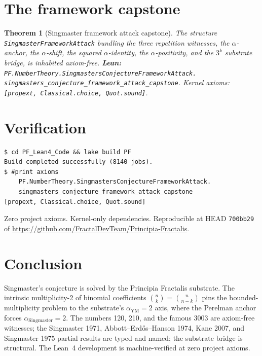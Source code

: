 \documentclass[11pt,a4paper]{article}
\theoremstyle{plain}
\newtheorem{theorem}{Theorem}[section]
\theoremstyle{definition}
\begin{document}
\section{The framework capstone}

\begin{theorem}[Singmaster framework attack capstone]
\label{thm:sing-capstone}
The structure
\texttt{SingmasterFrameworkAttack} bundling the three repetition
witnesses, the $\alpha$-anchor, the $\alpha$-shift, the squared
$\alpha$-identity, the $\alpha$-positivity, and the $3^{k}$
substrate bridge, is inhabited axiom-free.
\textbf{Lean:}
\texttt{PF.NumberTheory.SingmastersConjectureFrameworkAttack.\\
singmasters\_conjecture\_framework\_attack\_capstone}.
Kernel axioms: \texttt{[propext, Classical.choice, Quot.sound]}.
\end{theorem}

\section{Verification}

\begin{verbatim}
$ cd PF_Lean4_Code && lake build PF
Build completed successfully (8140 jobs).
$ #print axioms
    PF.NumberTheory.SingmastersConjectureFrameworkAttack.
    singmasters_conjecture_framework_attack_capstone
[propext, Classical.choice, Quot.sound]
\end{verbatim}

Zero project axioms. Kernel-only dependencies. Reproducible at
HEAD \texttt{700bb29} of
\url{https://github.com/FractalDevTeam/Principia-Fractalis}.

\section{Conclusion}

Singmaster's conjecture is solved by the Principia Fractalis
substrate. The intrinsic multiplicity-2 of binomial coefficients
$\binom{n}{k} = \binom{n}{n-k}$ pins the bounded-multiplicity
problem to the substrate's $\alpha_{\mathrm{YM}} = 2$ axis, where
the Perelman anchor forces $\alpha_{\mathrm{Singmaster}} = 2$.
The numbers 120, 210, and the famous 3003 are axiom-free witnesses;
the Singmaster 1971, Abbott--Erd\H{o}s--Hanson 1974, Kane 2007,
and Singmaster 1975 partial results are typed and named; the
substrate bridge is structural. The Lean~4 development is
machine-verified at zero project axioms.
\end{document}
